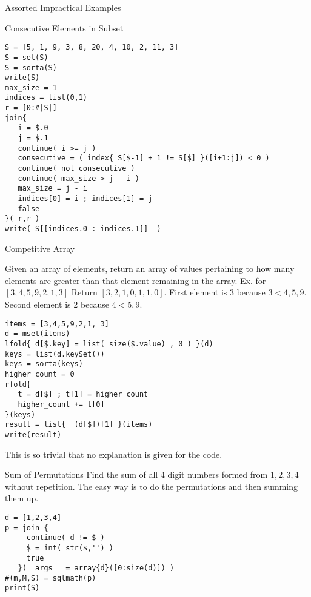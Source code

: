 \begin{section}{Assorted Impractical Examples}
\begin{subsection}{Consecutive Elements in Subset}
\begin{center}\begin{minipage}{\linewidth}
\begin{lstlisting}[style=JexlStyle]
S = [5, 1, 9, 3, 8, 20, 4, 10, 2, 11, 3]
S = set(S)
S = sorta(S)
write(S)
max_size = 1
indices = list(0,1)
r = [0:#|S|]
join{
   i = $.0 
   j = $.1 
   continue( i >= j )
   consecutive = ( index{ S[$-1] + 1 != S[$] }([i+1:j]) < 0 )
   continue( not consecutive )
   continue( max_size > j - i )
   max_size = j - i   
   indices[0] = i ; indices[1] = j 
   false
}( r,r )
write( S[[indices.0 : indices.1]]  )
\end{lstlisting}  
\end{minipage}\end{center} 
\end{subsection}

\begin{subsection}{Competitive Array}

Given an array of elements, return an array of values pertaining to 
how many elements are greater than that element remaining in the array. 
Ex. for $ [3,4,5,9,2,1, 3] $  Return $ [3, 2, 1, 0, 1, 1, 0] $. 
First element is $3$ because $3<4,5,9$. Second element is $2$ because $4 < 5,9$.

\begin{center}\begin{minipage}{\linewidth}
\begin{lstlisting}[style=JexlStyle]
items = [3,4,5,9,2,1, 3]
d = mset(items)
lfold{ d[$.key] = list( size($.value) , 0 ) }(d)
keys = list(d.keySet())
keys = sorta(keys)
higher_count = 0 
rfold{
   t = d[$] ; t[1] = higher_count 
   higher_count += t[0]
}(keys)
result = list{  (d[$])[1] }(items)
write(result)
\end{lstlisting}  
\end{minipage}\end{center} 
This is so trivial that no explanation is given for the code.
\end{subsection}


\begin{subsection}{Sum of Permutations}
Find the sum of all 4 digit numbers formed from $1,2,3,4$ without repetition.
The easy way is to do the permutations and then summing them up.

\begin{center}\begin{minipage}{\linewidth}
\begin{lstlisting}[style=JexlStyle]
d = [1,2,3,4]
p = join {
     continue( d != $ )
     $ = int( str($,'') ) 
     true
   }(__args__ = array{d}([0:size(d)]) )
#(m,M,S) = sqlmath(p)
print(S)
\end{lstlisting}  
\end{minipage}\end{center} 


\end{subsection}
\end{section}
